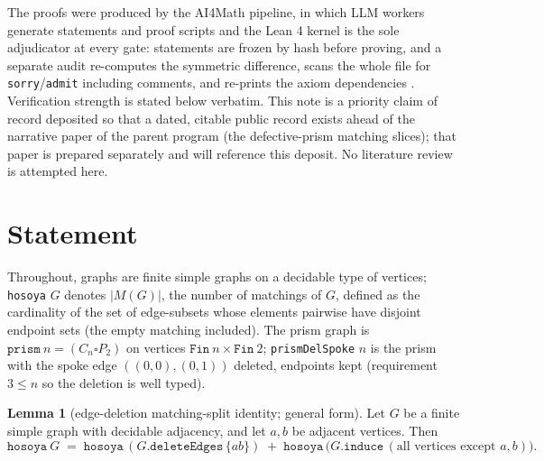 \documentclass[11pt]{article}
\theoremstyle{definition}
\newtheorem{lemma}{Lemma}
\begin{document}
The proofs were produced by the AI4Math pipeline, in which LLM workers
generate statements and proof scripts and the Lean 4 kernel is the sole
adjudicator at every gate: statements are frozen by hash before proving, and a
separate audit re-computes the symmetric difference, scans the whole file for
\texttt{sorry}/\texttt{admit} including comments, and re-prints the axiom
dependencies \cite{lean4}. Verification strength is stated below verbatim.
This note is a priority claim of record deposited so that a dated, citable
public record exists ahead of the narrative paper of the parent program (the
defective-prism matching slices); that paper is prepared separately and will
reference this deposit. No literature review is attempted here.

\section{Statement}\label{sec:statement}

Throughout, graphs are finite simple graphs on a decidable type of vertices;
\texttt{hosoya} $G$ denotes $|M(G)|$, the number of matchings of $G$, defined
as the cardinality of the set of edge-subsets whose elements pairwise have
disjoint endpoint sets (the empty matching included). The prism graph is
$\mathtt{prism}\ n=(C_n\square P_2)$ on vertices $\texttt{Fin}\ n\times
\texttt{Fin}\ 2$; \texttt{prismDelSpoke} $n$ is the prism with the spoke edge
$((0,0),(0,1))$ deleted, endpoints kept (requirement $3\le n$ so the deletion
is well typed).

\begin{lemma}[edge-deletion matching-split identity; general form]\label{lem:split}
Let $G$ be a finite simple graph with decidable adjacency, and let $a,b$ be
adjacent vertices. Then
\[
\mathtt{hosoya}\ G\;=\;\mathtt{hosoya}\,(G.\mathtt{deleteEdges}\,\{ab\})
\;+\;\mathtt{hosoya}\,\bigl(G.\mathtt{induce}\,(\text{all vertices except }
a,b)\bigr).
\]
\end{lemma}
\end{document}
